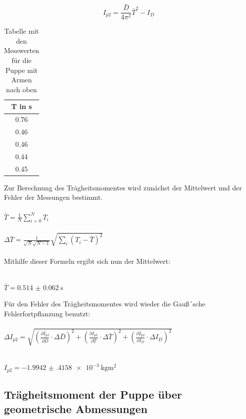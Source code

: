 \begin{equation}
  I_{p2} = \frac{\bar{D}}{4\pi^2}\bar{T}^2 - I_D
\end{equation}

\begin{table}[H]
  \centering
  \caption{Tabelle mit den Messwerten für die Puppe mit Armen nach oben}
  \begin{tabular}{c}
    \toprule
    T in \si{\second} \\
    \midrule
    0.76 \\
    0.46 \\
    0.46 \\
    0.44 \\
    0.45 \\
    \bottomrule
  \end{tabular}
\end{table}

Zur Berechnung des Trägheitsmomentes wird zunächst der Mittelwert und der Fehler
der Messungen bestimmt.\\\\

$\bar{T} = \frac{1}{N} \sum_{i=0}^{N} T_i$ \\\\

$\Delta \bar{T} = \frac{1}{\sqrt{N}\sqrt{N-1}} \sqrt{\sum_{i}(T_i-\bar{T})^2}$\\\\

Mithilfe dieser Formeln ergibt sich nun der Mittelwert:\\\\

\centerline{$\bar{T} = \SI{0.514(62)}{\second}$}

Für den Fehler des Trägheitsmomentes wird wieder die Gauß´sche Fehlerfortpflanzung
benutzt:\\\\

$\Delta I_{p2} = \sqrt{\left(\frac{\partial I_{p2}}{\partial \bar{D}} \cdot \Delta \bar{D} \right)^2
 + \left(\frac{\partial I_{p2}}{\partial \bar{T}} \cdot \Delta \bar{T} \right)^2
  + \left(\frac{\partial I_{p2}}{\partial I_D} \cdot \Delta I_D \right)^2}$\\\\

\centerline{$I_{p2} = \SI{-1.9942(4158)e-3}{\kilo\gram\meter\squared}$}

\subsection{Trägheitsmoment der Puppe über geometrische Abmessungen}

